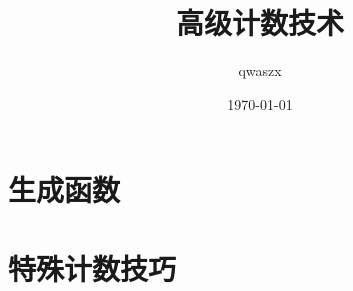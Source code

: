 \documentclass[11pt, a4paper]{ctexrep}
\title{高级计数技术}
\author{qwaszx}
\date{\today}
\begin{document}
\maketitle




\tableofcontents

\part{生成函数}



















\part{特殊计数技巧}





% 
\end{document}
